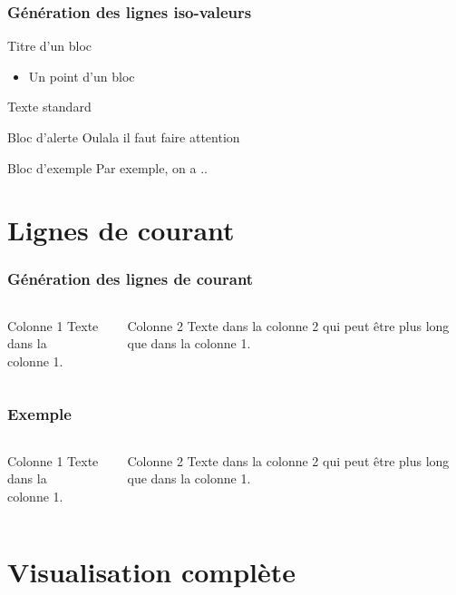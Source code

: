 \documentclass{beamer}
\begin{document}
\begin{frame}
  \frametitle{Génération des lignes iso-valeurs}
  \begin{block}{Titre d'un bloc}
    \begin{itemize}
      \item Un point d'un bloc
    \end{itemize}
    Texte standard
  \end{block}

  \begin{alertblock}{Bloc d'alerte}
    Oulala il faut faire attention
  \end{alertblock}

  \begin{exampleblock}{Bloc d'exemple}
    Par exemple, on a ..
  \end{exampleblock}
\end{frame}

\section[Lignes de courant]{Lignes de courant}

\begin{frame}
  \frametitle{Génération des lignes de courant}
  \begin{columns}[T,totalwidth=\textwidth] %
  \begin{column}{5cm}
  \begin{block}{Colonne 1}
    Texte dans la\\
    colonne 1.
  \end{block}
  \end{column}

  \begin{column}{5cm}
  \begin{block}{Colonne 2}
    Texte dans la
    colonne 2 qui peut être
    plus long que dans la
    colonne 1.
  \end{block}
  \end{column}
 \end{columns}
\end{frame}

\begin{frame}
  \frametitle{Exemple}
  \begin{columns}[T,totalwidth=\textwidth] %
  \begin{column}{5cm}
  \begin{block}{Colonne 1}
    Texte dans la\\
    colonne 1.
  \end{block}
  \end{column}

  \begin{column}{5cm}
  \begin{block}{Colonne 2}
    Texte dans la
    colonne 2 qui peut être
    plus long que dans la
    colonne 1.
  \end{block}
  \end{column}
 \end{columns}
\end{frame}


\section{Visualisation complète}
\end{document}

